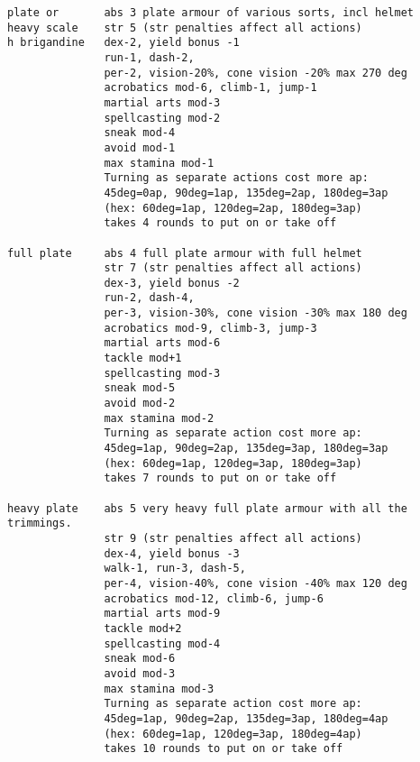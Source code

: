 \begin{verbatim}
plate or       abs 3 plate armour of various sorts, incl helmet
heavy scale    str 5 (str penalties affect all actions)
h brigandine   dex-2, yield bonus -1
               run-1, dash-2,
               per-2, vision-20%, cone vision -20% max 270 deg
               acrobatics mod-6, climb-1, jump-1
               martial arts mod-3
               spellcasting mod-2
               sneak mod-4
               avoid mod-1
               max stamina mod-1
               Turning as separate actions cost more ap:
               45deg=0ap, 90deg=1ap, 135deg=2ap, 180deg=3ap
               (hex: 60deg=1ap, 120deg=2ap, 180deg=3ap)
               takes 4 rounds to put on or take off

full plate     abs 4 full plate armour with full helmet
               str 7 (str penalties affect all actions)
               dex-3, yield bonus -2
               run-2, dash-4,
               per-3, vision-30%, cone vision -30% max 180 deg
               acrobatics mod-9, climb-3, jump-3
               martial arts mod-6
               tackle mod+1
               spellcasting mod-3
               sneak mod-5
               avoid mod-2
               max stamina mod-2
               Turning as separate action cost more ap:
               45deg=1ap, 90deg=2ap, 135deg=3ap, 180deg=3ap
               (hex: 60deg=1ap, 120deg=3ap, 180deg=3ap)
               takes 7 rounds to put on or take off

heavy plate    abs 5 very heavy full plate armour with all the trimmings.
               str 9 (str penalties affect all actions)
               dex-4, yield bonus -3
               walk-1, run-3, dash-5,
               per-4, vision-40%, cone vision -40% max 120 deg
               acrobatics mod-12, climb-6, jump-6
               martial arts mod-9
               tackle mod+2
               spellcasting mod-4
               sneak mod-6
               avoid mod-3
               max stamina mod-3
               Turning as separate action cost more ap:
               45deg=1ap, 90deg=2ap, 135deg=3ap, 180deg=4ap
               (hex: 60deg=1ap, 120deg=3ap, 180deg=4ap)
               takes 10 rounds to put on or take off

\end{verbatim}
\normalsize




